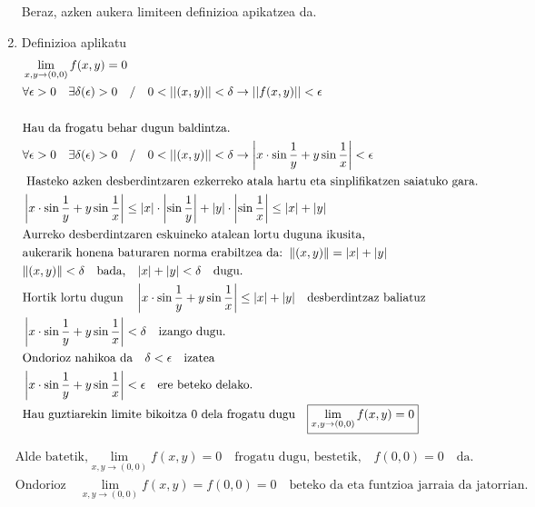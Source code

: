 \begin{enumerate}
    Beraz, azken aukera limiteen definizioa apikatzea da. 
    \item Definizioa aplikatu
    \begin{align*}
    &\lim_{x,y \to (0,0)}f(x,y)=0\\
    &\forall \epsilon >0 \quad \exists \delta(\epsilon)>0 \quad / \quad0<||(x,y)||<\delta \rightarrow ||f(x,y)||<\epsilon  \\
    \\
    &\text{Hau da frogatu behar dugun baldintza.}\\
    &\forall \epsilon >0 \quad \exists \delta(\epsilon)>0 \quad / \quad0<||(x,y)||<\delta \rightarrow \left|x\cdot \sin \frac{1}{y}+ y \sin \frac{1}{x}\right|<\epsilon  \\
    &\text{ Hasteko azken desberdintzaren ezkerreko atala hartu eta sinplifikatzen saiatuko gara.}\\
    &\left|x\cdot \sin \frac{1}{y}+ y \sin \frac{1}{x}\right|\leq\left| x\right|\cdot\left |\sin\frac{1}{y}\right |+\left|y\right|\cdot\left|\sin\frac{1}{x}\right|\leq \abs{x}+\abs{y}\\
    &\text{Aurreko desberdintzaren eskuineko atalean lortu duguna ikusita,}\\
    &\text{aukerarik honena baturaren norma erabiltzea da:} \;\; \| (x,y) \| =\abs{x}+\abs{y}\ \\
    &\| (x,y)\| < \delta \quad \text{bada,} \quad | x | + | y | < \delta \quad \text{dugu.}\\
    &\text{Hortik lortu dugun}\quad\left|x\cdot \sin \frac{1}{y}+ y \sin \frac{1}{x}\right|\leq \abs{x}+\abs{y}\quad \text{desberdintzaz baliatuz}\\
    &\left|x\cdot \sin \frac{1}{y}+ y \sin \frac{1}{x}\right|< \delta\quad \text{izango dugu.}\\
    &\text{Ondorioz nahikoa da}\quad \delta < \epsilon \quad \text{izatea }\\
    &\left|x\cdot \sin \frac{1}{y}+ y \sin \frac{1}{x}\right| < \epsilon \quad \text{ere beteko delako.}\\
    &\text{Hau guztiarekin limite bikoitza 0 dela frogatu dugu} \quad \boxed{\lim_{x,y \to (0,0)}f(x,y)=0}
    \end{align*}
\end{enumerate}

\begin{align*}
    &\text{Alde batetik,}\lim_{x,y \to (0,0)}f(x,y)=0\quad \text{frogatu dugu, bestetik,}\quad f(0,0)=0 \quad \text{da.}\\ &\text{Ondorioz} \quad \boxed{\lim_{x,y \to (0,0)}f(x,y)=f(0,0)=0} \quad \text{beteko da eta funtzioa jarraia da jatorrian.}
\end{align*}











